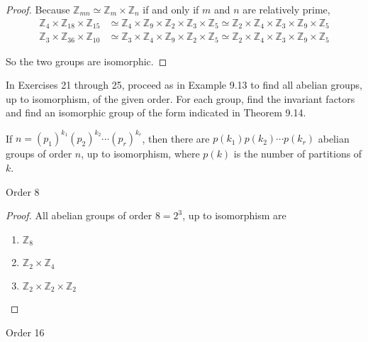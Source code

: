 \begin{proof}
    Because $\mathbb{Z}_{mn}\simeq \mathbb{Z}_{m}\times\mathbb{Z}_{n}$ if and only if $m$ and $n$ are relatively prime,
    \begin{align*}
        \mathbb{Z}_{4}\times\mathbb{Z}_{18}\times\mathbb{Z}_{15} & \simeq \mathbb{Z}_{4}\times\mathbb{Z}_{9}\times\mathbb{Z}_{2}\times\mathbb{Z}_{3}\times\mathbb{Z}_{5} \simeq \mathbb{Z}_{2}\times\mathbb{Z}_{4}\times\mathbb{Z}_{3}\times\mathbb{Z}_{9}\times\mathbb{Z}_{5}  \\
        \mathbb{Z}_{3}\times\mathbb{Z}_{36}\times\mathbb{Z}_{10} & \simeq \mathbb{Z}_{3}\times\mathbb{Z}_{4}\times\mathbb{Z}_{9}\times\mathbb{Z}_{2}\times\mathbb{Z}_{5} \simeq \mathbb{Z}_{2}\times \mathbb{Z}_{4}\times\mathbb{Z}_{3}\times\mathbb{Z}_{9}\times\mathbb{Z}_{5}
    \end{align*}

    So the two groups are isomorphic.
\end{proof}

In Exercises 21 through 25, proceed as in Example 9.13 to find all abelian groups, up to isomorphism, of the given order. For each group, find the invariant factors and find an isomorphic group of the form indicated in Theorem 9.14.

If $n = {(p_{1})}^{k_{1}}{(p_{2})}^{k_{2}}\cdots {(p_{r})}^{k_{r}}$, then there are $p(k_{1})p(k_{2})\cdots p(k_{r})$ abelian groups of order $n$, up to isomorphism, where $p(k)$ is the number of partitions of $k$.

\newpage
\begin{exercise}
    Order 8
\end{exercise}

\begin{proof}
    All abelian groups of order $8 = 2^{3}$, up to isomorphism are
    \begin{enumerate}
        \item $\mathbb{Z}_{8}$
        \item $\mathbb{Z}_{2} \times \mathbb{Z}_{4}$
        \item $\mathbb{Z}_{2} \times \mathbb{Z}_{2} \times \mathbb{Z}_{2}$
    \end{enumerate}
\end{proof}

\newpage
\begin{exercise}
    Order 16
\end{exercise}

